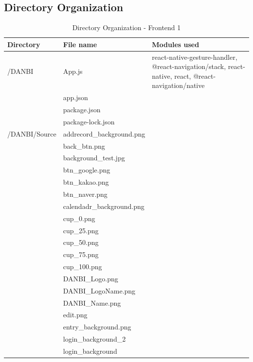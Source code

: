 \documentclass[conference]{IEEEtran}
\begin{document}
\subsection{Directory Organization}
\setlength{\parindent}{2ex}
\begin{table}[h!]

        \begin{threeparttable}
            \caption{Directory Organization - Frontend 1%
            \label{tab:table5}}    %
            \begin{tabular}{p{2.4cm}p{2.8cm}p{2cm}}
            \toprule
            \bfseries Directory & \bfseries File name & \multicolumn{1}{l}{\bfseries Modules used} \\
            \midrule
            /DANBI 
            & App.js& react-native-gesture-handler, @react-navigation/stack, react-native, react, @react-navigation/native \\
            & app.json\\
            & package.json\\
            & package-lock.json\\
            \hline
            /DANBI/Source
            & addrecord\_background.png\\
            & back\_btn.png\\
            & background\_test.jpg\\
            & btn\_google.png\\
            & btn\_kakao.png\\
            & btn\_naver.png\\
            & calendadr\_background.png\\
            & cup\_0.png\\
            & cup\_25.png\\
            & cup\_50.png\\
            & cup\_75.png\\
            & cup\_100.png\\
            & DANBI\_Logo.png\\
            & DANBI\_LogoName.png\\
            & DANBI\_Name.png\\
            & edit.png\\
            & entry\_background.png\\
            & login\_background_2\\
            & login\_background\\

\end{tabular}
\end{threeparttable}
\end{table}
\end{document}
